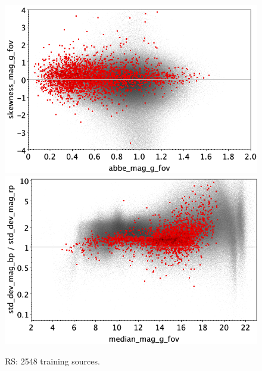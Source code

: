 \documentclass[longauth]{aa}
\begin{document}
\begin{appendix}
\begin{figure}
\vspace{4mm}
 \includegraphics[width=0.45\hsize]{figures/appendix/RS_trn_ask.png}  %
\hspace{2mm}
 \includegraphics[width=0.45\hsize]{figures/appendix/RS_trn_msdr.png}  \\ %
\vspace{4mm}
 \caption{RS: 2548 training sources.}  
 \label{fig:app:RS_trn}
\end{figure}


\end{appendix}
\end{document}
